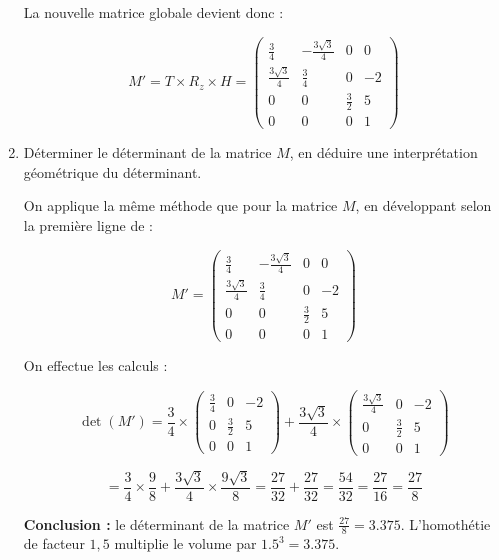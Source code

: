 \documentclass[a4paper,12pt]{article}
\begin{document}
\begin{enumerate}
    La nouvelle matrice globale devient donc :

    \[
    M' = T \times R_z \times H
    = 
    \begin{pmatrix}
    \frac{3}{4} & -\frac{3\sqrt{3}}{4} & 0 & 0 \\
    \frac{3\sqrt{3}}{4} & \frac{3}{4} & 0 & -2 \\
    0 & 0 & \frac{3}{2} & 5 \\
    0 & 0 & 0 & 1
    \end{pmatrix}
    \] \newline

  \item Déterminer le déterminant de la matrice $M$, en déduire une interprétation géométrique du déterminant. \newline

    On applique la même méthode que pour la matrice \(M\), en développant selon la première ligne de :

    \[
    M' = 
    \begin{pmatrix}
    \frac{3}{4} & -\frac{3\sqrt{3}}{4} & 0 & 0 \\
    \frac{3\sqrt{3}}{4} & \frac{3}{4} & 0 & -2 \\
    0 & 0 & \frac{3}{2} & 5 \\
    0 & 0 & 0 & 1
    \end{pmatrix}
    \]

    On effectue les calculs :

    \[
    \det(M') =
    \frac{3}{4} \times 
    \begin{pmatrix}
    \frac{3}{4} & 0 & -2 \\
    0 & \frac{3}{2} & 5 \\
    0 & 0 & 1
    \end{pmatrix}
    + \frac{3\sqrt{3}}{4} \times 
    \begin{pmatrix}
    \frac{3\sqrt{3}}{4} & 0 & -2 \\
    0 & \frac{3}{2} & 5 \\
    0 & 0 & 1
    \end{pmatrix}
    \]

    \[
    = \frac{3}{4} \times \frac{9}{8} + \frac{3\sqrt{3}}{4} \times \frac{9\sqrt{3}}{8}
    = \frac{27}{32} + \frac{27}{32} = \frac{54}{32} = \frac{27}{16} = \frac{27}{8}
    \] \newline

    \textbf{Conclusion :} le déterminant de la matrice \(M'\) est \(\frac{27}{8} = 3.375\).  
    L’homothétie de facteur \(1{,}5\) multiplie le volume par \(1.5^3 = 3.375\). \newline


\end{enumerate}
\end{document}
